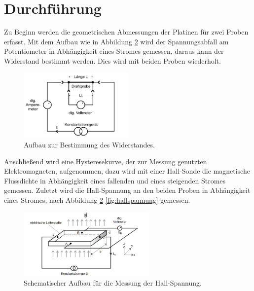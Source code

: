 \newpage
\section{Durchführung}
\label{sec:Durchführung}
Zu Beginn werden die geometrischen Abmessungen der Platinen für zwei Proben erfasst.
Mit dem Aufbau wie in Abbildung \ref{fig:widerstand} wird der Spannungsabfall am Potentiometer in Abhängigkeit eines Stromes gemessen, daraus kann
der Widerstand bestimmt werden. Dies wird mit beiden Proben wiederholt.
\begin{figure}
  \centering
  \includegraphics[width=0.5\textwidth]{widerstand.PNG}
  \caption{Aufbau zur Bestimmung des Widerstandes.\cite{sample}}
  \label{fig:widerstand}
\end{figure}
\FloatBarrier
Anschließend wird eine Hysteresekurve, der zur Messung genutzten Elektromagneten, aufgenommen, dazu wird mit einer Hall-Sonde die magnetische Flussdichte in Abhängigkeit
eines fallenden und eines steigenden Stromes gemessen.
Zuletzt wird die Hall-Spannung an den beiden Proben in Abhängigkeit eines Stromes, nach Abbildung \ref{fig:widerstand}
\ref{fig:hallspannung} gemessen.
\begin{figure}
  \centering
  \includegraphics[width=0.6\textwidth]{hall.PNG}
  \caption{Schematischer Aufbau für die Messung der Hall-Spannung.\cite{sample}}
  \label{fig:widerstand}
\end{figure}
\FloatBarrier
